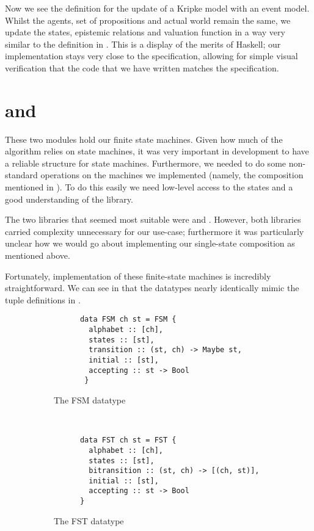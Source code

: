 \documentclass[10pt, a4paper]{report}
\begin{document}
Now we see the definition for the update of a Kripke model with an event model.
Whilst the agents, set of propositions and actual world remain the same, we
update the states, epistemic relations and valuation function in a way very
similar to the definition in . This is a display of
the merits of Haskell; our implementation stays very close to the specification,
allowing for simple visual verification that the code that we have written matches
the specification. 

\section{ and }

These two modules hold our finite state machines. Given how much of the
algorithm relies on state machines, it was very important in development to have
a reliable structure for state machines. Furthermore, we needed to do some
non-standard operations on the machines we implemented (namely, the composition
mentioned in ). To do this easily we need
low-level access to the states and a good understanding of the library. 

The two libraries that seemed most suitable were \cite{HaskellFST} and
\cite{HaskellMachines}. However, both libraries carried complexity unnecessary
for our use-case; furthermore it was particularly unclear how we would go
about implementing our single-state composition as mentioned above. 

Fortunately, implementation of these finite-state machines is incredibly
straightforward. We can see in  that the datatypes nearly
identically mimic the tuple definitions in .


\begin{figure}[h]
  \centering
  \begin{subfigure}[b]{0.5\textwidth}
    \begin{verbatim}
      data FSM ch st = FSM {
        alphabet :: [ch],              
        states :: [st],               
        transition :: (st, ch) -> Maybe st,
        initial :: [st],            
        accepting :: st -> Bool    
       }
    \end{verbatim}
    \caption{The FSM datatype}
  \end{subfigure}%
~
  \begin{subfigure}[b]{0.5\textwidth}
    \begin{verbatim}
      data FST ch st = FST {
        alphabet :: [ch],                     
        states :: [st],                       
        bitransition :: (st, ch) -> [(ch, st)],
        initial :: [st],                      
        accepting :: st -> Bool              
      }
    \end{verbatim}
    \caption{The FST datatype}
  \end{subfigure}
  \caption{}
  \label{fig:FSMFST}
\end{figure}
\end{document}
